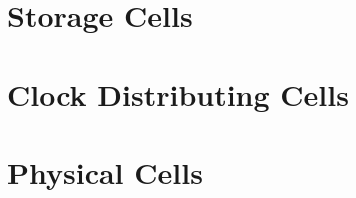 






\chapter{Storage Cells}





\chapter{Clock Distributing Cells}





\chapter{Physical Cells}









